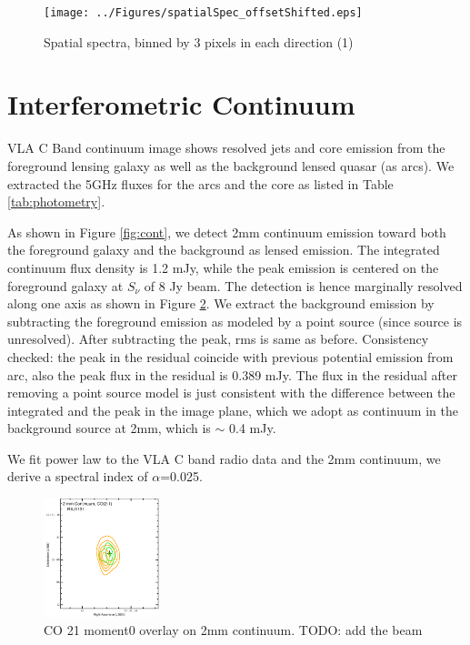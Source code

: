 \documentclass[]{emulateapj}
\begin{document}
\begin{figure}[tbph]
\centering
\texttt{[image: ../Figures/spatialSpec\_offsetShifted.eps]}
\caption{
Spatial spectra, binned by 3 pixels in each direction (1)
 \label{fig:spatialSpec}}
\end{figure}



\section{Interferometric Continuum}
%
%
%

VLA C Band continuum image shows resolved jets and core emission from the foreground lensing galaxy as well as the 
background
lensed quasar (as arcs). We extracted the 5GHz fluxes for the arcs and the core as listed in Table \ref{tab:photometry}.

As shown in Figure \ref{fig:cont}, we detect 2mm continuum emission toward both the foreground galaxy and the background 
as lensed
emission.
The integrated continuum flux density is 1.2 mJy, while the peak emission is centered on the foreground galaxy at 
$S_\nu$ of 8 \micron Jy beam\pmOne.  The detection is hence marginally resolved along one axis as shown in Figure \ref{fig:contco21}.
We extract the background emission by subtracting the foreground emission as modeled by a point source (since source is 
unresolved).
After subtracting the peak, rms is same as before.
Consistency checked: the peak in the residual coincide with previous potential emission from arc, also the peak flux in the 
residual is 0.389 mJy.
The flux in the residual after removing a point source model is just consistent with the difference between the integrated and 
the peak in the
image plane, which we adopt as continuum in the background source at 2mm, which is $\sim$ 0.4 mJy.

We fit power law to the VLA C band radio data and the 2mm continuum, we derive a spectral index of $\alpha$=0.025.
\begin{figure}[!htbp]
\centering
\includegraphics[width=0.3\textwidth]{../Figures/ContCO21.eps}
\caption{CO 21 moment0 overlay on 2mm continuum.  %
TODO: add the beam
 \label{fig:contco21}}
\end{figure}
\end{document}
